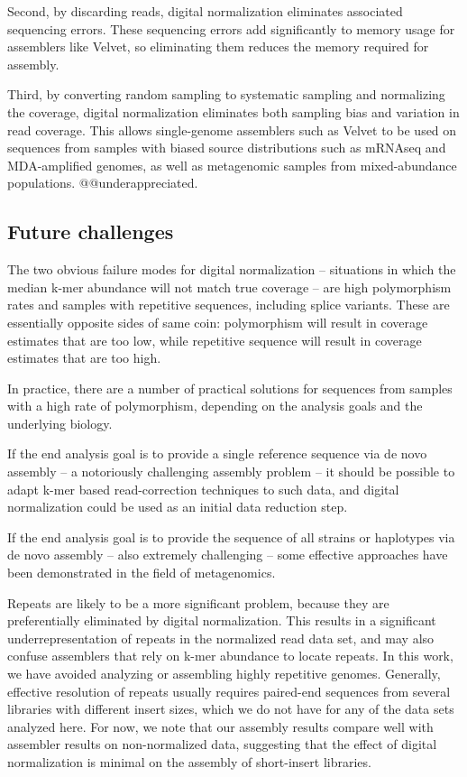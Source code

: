 \documentclass[10pt]{article}
\begin{document}
Second, by discarding reads, digital normalization eliminates
associated sequencing errors.  These sequencing errors add
significantly to memory usage for assemblers like Velvet, so
eliminating them reduces the memory required for assembly.

Third, by converting random sampling to systematic sampling and
normalizing the coverage, digital normalization eliminates both
sampling bias and variation in read coverage.  This allows
single-genome assemblers such as Velvet to be used on sequences from
samples with biased source distributions such as mRNAseq and
MDA-amplified genomes, as well as metagenomic samples from
mixed-abundance populations. @@underappreciated.

\subsection*{Future challenges}

The two obvious failure modes for digital normalization -- situations
in which the median k-mer abundance will not match true coverage --
are high polymorphism rates and samples with repetitive sequences,
including splice variants.  These are essentially opposite sides of
same coin: polymorphism will result in coverage estimates that are too
low, while repetitive sequence will result in coverage estimates that
are too high.

In practice, there are a number of practical solutions for sequences
from samples with a high rate of polymorphism, depending on the
analysis goals and the underlying biology.

If the end analysis goal is to provide a single reference sequence via
de novo assembly -- a notoriously challenging assembly problem -- it
should be possible to adapt k-mer based read-correction techniques to
such data, and digital normalization could be used as an initial data
reduction step.

If the end analysis goal is to provide the sequence of all strains or
haplotypes via de novo assembly -- also extremely challenging -- some
effective approaches have been demonstrated in the field of
metagenomics.

Repeats are likely to be a more significant problem, because they are
preferentially eliminated by digital normalization.  This results in a
significant underrepresentation of repeats in the normalized read data
set, and may also confuse assemblers that rely on k-mer abundance to
locate repeats.  In this work, we have avoided analyzing or assembling
highly repetitive genomes.  Generally, effective resolution of repeats
usually requires paired-end sequences from several libraries with
different insert sizes, which we do not have for any of the data sets
analyzed here.  For now, we note that our assembly results compare
well with assembler results on non-normalized data, suggesting that
the effect of digital normalization is minimal on the assembly of
short-insert libraries.
\end{document}
